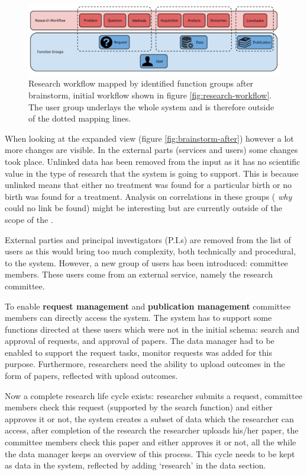 \begin{figure}[hb]
	\centering
	\includegraphics[width=1.0\linewidth]{images/research-workflow-after}
	\caption{
		Research workflow mapped by identified function groups after brainstorm, initial workflow shown in figure \ref{fig:research-workflow}.
		The user group underlays the whole system and is therefore outside of the dotted mapping lines.
	}
	\label{fig:workflow-after}
\end{figure}

When looking at the expanded view (figure \ref{fig:brainstorm-after}) however a lot more changes are visible.
In the external parts (services and users) some changes took place.
Unlinked data has been removed from the input as it has no scientific value in the type of research that the system is going to support.
This is because unlinked means that either no treatment was found for a particular birth or no birth was found for a treatment.
Analysis on correlations in these groups (\ie{} \emph{why} could no link be found) might be interesting but are currently outside of the scope of the \project{}.

External parties and principal investigators (P.I.s) are removed from the list of users as this would bring too much complexity, both technically and procedural, to the system.
However, a new group of users has been introduced: committee members.
These users come from an external service, namely the research committee.

To enable \textbf{request management} and \textbf{publication management} committee members can directly access the system.
The system has to support some functions directed at these users which were not in the initial schema: search and approval of requests, and approval of papers.
The data manager had to be enabled to support the request tasks, monitor requests was added for this purpose.
Furthermore, researchers need the ability to upload outcomes in the form of papers, reflected with upload outcomes.

Now a complete research life cycle exists: researcher submits a request, committee members check this request (supported by the search function) and either approves it or not, the system creates a subset of data which the researcher can access, after completion of the research the researcher uploads his/her paper, the committee members check this paper and either approves it or not, all the while the data manager keeps an overview of this process.
This cycle needs to be kept as data in the system, reflected by adding `research' in the data section.

